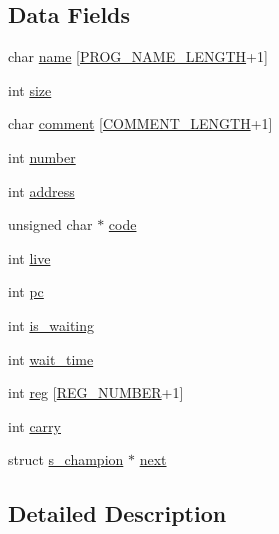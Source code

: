 \subsection*{Data Fields}
\begin{DoxyCompactItemize}
\item 
char \hyperlink{structs__champion_a28dc0293f716f3fbb2d0bd1cb83f93a2}{name} \mbox{[}\hyperlink{op_8h_a2bd1b5655c5d92af5ebe7f4bb3436b73}{P\-R\-O\-G\-\_\-\-N\-A\-M\-E\-\_\-\-L\-E\-N\-G\-T\-H}+1\mbox{]}
\item 
int \hyperlink{structs__champion_a439227feff9d7f55384e8780cfc2eb82}{size}
\item 
char \hyperlink{structs__champion_ae6da1ff2fd8abd8f79b0a42acf5b98b9}{comment} \mbox{[}\hyperlink{op_8h_a31a10f5d8e8f9085ce0224cf043cb5fa}{C\-O\-M\-M\-E\-N\-T\-\_\-\-L\-E\-N\-G\-T\-H}+1\mbox{]}
\item 
int \hyperlink{structs__champion_a7106e2abc437ad981830d14176d15f09}{number}
\item 
int \hyperlink{structs__champion_a45c6bc6d1135dc398bf8deae861a2ebc}{address}
\item 
unsigned char $\ast$ \hyperlink{structs__champion_a10a8d8076a169aad66a5134a4b372c91}{code}
\item 
int \hyperlink{structs__champion_a2cb50263f0f7a37d88d397a1d0e66f3a}{live}
\item 
int \hyperlink{structs__champion_ac8c81e61335635fa4709d82412b31f06}{pc}
\item 
int \hyperlink{structs__champion_aa3d81fb1fe67fe93e9095477c8914837}{is\-\_\-waiting}
\item 
int \hyperlink{structs__champion_a1853c17443a5893d3acd539b3c7a9289}{wait\-\_\-time}
\item 
int \hyperlink{structs__champion_a205e2cf1e11ba6a2f7110d4b650e971c}{reg} \mbox{[}\hyperlink{op_8h_abf79fff3592092be3713730487d8987e}{R\-E\-G\-\_\-\-N\-U\-M\-B\-E\-R}+1\mbox{]}
\item 
int \hyperlink{structs__champion_ac33dd0ad72380ad7b52434992811c5a7}{carry}
\item 
struct \hyperlink{structs__champion}{s\-\_\-champion} $\ast$ \hyperlink{structs__champion_a2d18ffa3b1babc703aa8b1cd3812f7ad}{next}
\end{DoxyCompactItemize}


\subsection{Detailed Description}


